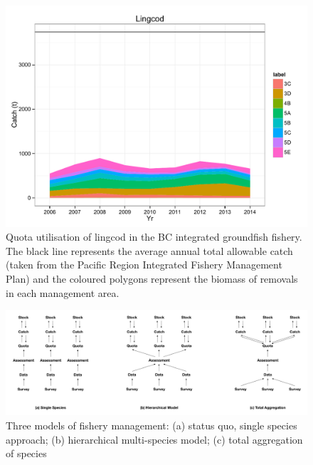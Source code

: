 \documentclass[]{scrartcl}
\begin{document}
\newpage

\begin{figure}[htbp]
\centering
\includegraphics{figures/lingcod.pdf}
\caption{Quota utilisation of lingcod in the BC integrated groundfish fishery. The black line represents the average annual total allowable catch (taken from the Pacific Region Integrated Fishery Management Plan) and the coloured polygons represent the biomass of removals in each management area.}\label{fig:lingcod}
\end{figure}

\newpage

\begin{figure}[htbp]
\centering
\includegraphics{figures/msFishery.pdf}
\caption{Three models of fishery management: (a) status quo,
single species approach; (b) hierarchical multi-species model; (c) total aggregation of species}\label{fig:3Models}
\end{figure}

\newpage
\end{document}
